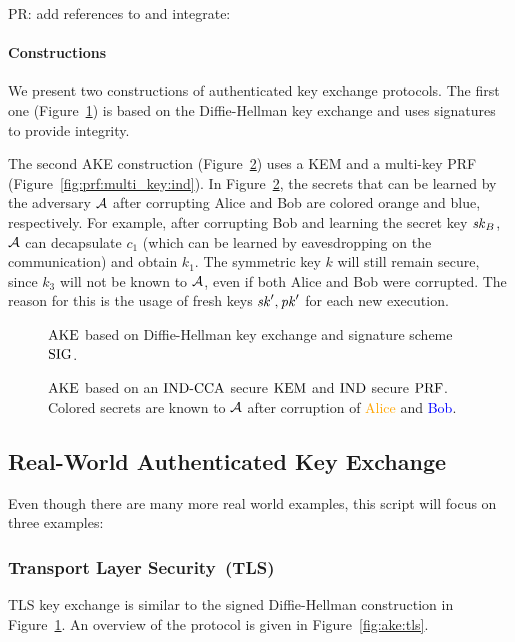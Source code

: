 \alert{PR: add references to and integrate: \cite{RSA:PRSS21,EPRINT:BCJSW24}}

\paragraph{Constructions} We present two constructions of authenticated key exchange protocols. 
The first one (Figure~\ref{fig:ake:signed_dh}) is based on the Diffie-Hellman key exchange and uses signatures to provide integrity.

The second AKE construction (Figure~\ref{fig:ake:kem}) uses a KEM and a multi-key PRF (Figure~\ref{fig:prf:multi_key:ind}). 
In Figure~\ref{fig:ake:kem}, the secrets that can be learned by the adversary $\mathcal{A}$ after corrupting Alice and Bob are colored orange and blue, respectively.
For example, after corrupting Bob and learning the secret key $\mathit{sk}_B$, $\mathcal{A}$ can decapsulate $c_1$ (which can be learned by eavesdropping on the communication) and obtain $k_1$.
The symmetric key $k$ will still remain secure, since $k_3$ will not be known to $\mathcal{A}$, even if both Alice and Bob were corrupted.
The reason for this is the usage of fresh keys $\mathit{sk}',\mathit{pk}'$ for each new execution.

\begin{figure}[!ht]
    \centering
    
    \caption{$\mathrm{AKE}$ based on Diffie-Hellman key exchange and signature scheme $\mathrm{SIG}$.}
    \label{fig:ake:signed_dh}
\end{figure}

\begin{figure}[!ht]
    \centering
    
    \caption{$\mathrm{AKE}$ based on an ${\mathrm{IND}\text{-}\mathrm{CCA}}$ secure $\mathrm{KEM}$ and ${\mathrm{IND}}$ secure $\mathrm{PRF}$. Colored secrets are known to $\mathcal{A}$ after corruption of \textcolor{orange}{Alice} and \textcolor{blue}{Bob}.}
    \label{fig:ake:kem}
\end{figure}

\subsection{Real-World Authenticated Key Exchange}
Even though there are many more real world examples, this script will focus on three examples:

\subsubsection{Transport Layer Security~(TLS) \cite{RFCTLS13}}
TLS key exchange is similar to the signed Diffie-Hellman construction in Figure~\ref{fig:ake:signed_dh}.
An overview of the protocol is given in Figure~\ref{fig:ake:tls}.

